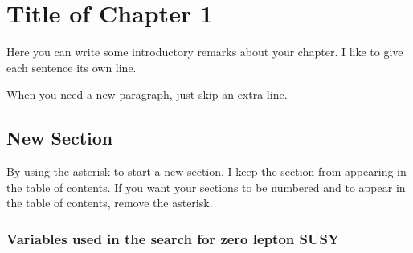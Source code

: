 

\chapter[Table of Contents Title][Top of Page Title]{Title of Chapter 1}

Here you can write some introductory remarks about your chapter.
I like to give each sentence its own line.

When you need a new paragraph, just skip an extra line.

\section{New Section}

By using the asterisk to start a new section, I keep the section from appearing in the table of contents.
If you want your sections to be numbered and to appear in the table of contents, remove the asterisk.

\subsection*{Variables used in the search for zero lepton SUSY}